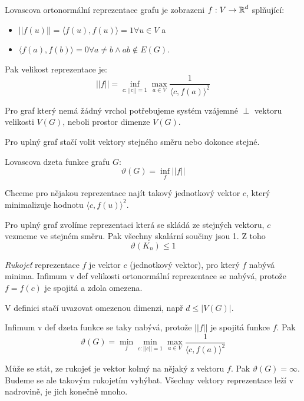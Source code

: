 \begin{definition}
	Lovascova ortonormální reprezentace grafu je zobrazeni $f:V \to \operatorname{\mathbb{R}}^d$ splňující:
	\begin{itemize}
		\item $|| f(u) || = \langle f(u), f(u) \rangle = 1 \forall u \in V$ a
		\item $\langle f(a), f(b) \rangle = 0 \forall a \ne b \land ab \notin E(G)$.
	\end{itemize}

	Pak velikost reprezentace je:
	\[ || f || = \inf_{c: ||c|| = 1} \max_{a \in V} \frac{1}{\langle c, f(a) \rangle^2} \]
\end{definition}

\begin{example}
	Pro graf který nemá žádný vrchol potřebujeme systém vzájemné $\perp$ vektoru velikosti $V(G)$, neboli prostor dimenze $V(G)$.

	Pro uplný graf stačí volit vektory stejného směru nebo dokonce stejné.
\end{example}

\begin{definition}
	Lovascova dzeta funkce grafu $G$:
	\[ \vartheta(G) = \inf_f || f || \]

	Chceme pro nějakou reprezentace najít takový jednotkový vektor $c$, který minimalizuje hodnotu $\langle c, f(u) \rangle^2$.
\end{definition}

\begin{example}
	Pro uplný graf zvolíme reprezentaci která se skládá ze stejných vektoru, $c$ vezmeme ve stejném směru.
	Pak všechny skalární součiny jsou 1. Z toho
	\[ \vartheta(K_n) \leq 1 \]
\end{example}

\begin{definition}
	\emph{Rukojeť} reprezentace $f$ je vektor $c$ (jednotkový vektor), pro který $f$ nabývá minima.
	Infimum v def velikosti ortonormální reprezentace se nabývá, protože $f = f(c)$ je spojitá a zdola omezena.

	V definici stačí uvazovat omezenou dimenzi, např $d \leq |V(G)|$.

	Infimum v def dzeta funkce se taky nabývá, protože $||f||$ je spojitá funkce $f$. Pak
	\[ \vartheta(G) = \min_f \min_{c: ||c|| = 1} \max_{a \in V} \frac{1}{\langle c, f(a) \rangle^2} \]
\end{definition}
\begin{agreement}
	Může se stát, ze rukojeť je vektor kolmý na nějaký z vektoru $f$. Pak $\vartheta(G) = \infty$.
	Budeme se ale takovým rukojetím vyhýbat. Všechny vektory reprezentace leží v nadrovině, je jich konečně mnoho.
\end{agreement}

